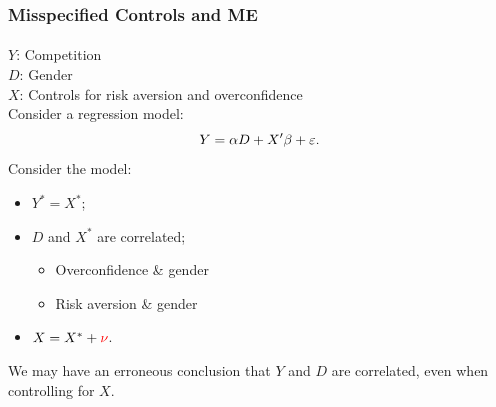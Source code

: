 \begin{frame}\label{slide:NV}
\frametitle{Misspecified Controls and ME}
\framesubtitle{\cite{niederle2007women}}
    $Y$: Competition\\
    $D$: Gender\\
    $X$: Controls for risk aversion and overconfidence\\
    \vspace{3mm}
    Consider a regression model:
    \begin{equation*}
        Y = \alpha D + X'\beta + \varepsilon.
    \end{equation*}
    Consider the model:
    \begin{itemize}
        \item $Y^{*}=X^{*}$;
        \item $D$ and $X^{*}$ are correlated;
        \begin{itemize}
            \item Overconfidence \& gender \citep{moore2008trouble}
            \item Risk aversion \& gender \citep{charness2013experimental, holt2014assessment}
        \end{itemize}
        \item $X=X^{*}+{\color{red}\nu}$.
    \end{itemize}
    \vspace{3mm}
    \color{blue}We may have an erroneous conclusion that $Y$ and $D$ are correlated, even when controlling for $X$. \hyperlink{app:sim_control1}{}
\end{frame}

